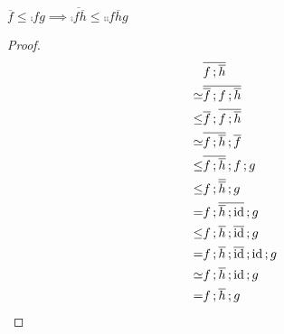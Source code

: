 \documentclass[runningheads,envcountsame]{llncs}
\begin{document}
\begin{lemma}
    $\overline{f} \leq \comp{f}{g} \implies \overline{\comp{f}{\overline{h}}} \leq \comp{\comp{f}{\overline{h}}}{g} \label{equ:restriction-insert}$
\end{lemma}
\begin{proof}
    \begin{align}
         & \overline{\comp{f}{\overline{h}}} \\
    \simeq & \overline{\comp{\overline{f}}{\comp{f}{\overline{h}}}} \\
    \leq & \comp{\overline{f}}{\overline{\comp{f}{\overline{h}}}} \\
    \simeq & \comp{\overline{\comp{f}{\overline{h}}}}{\overline{f}} \\
    \leq & \comp{\overline{\comp{f}{\overline{h}}}}{\comp{f}{g}} \\
    \leq & \comp{\comp{f}{\overline{\overline{h}}}}{g} \\
    = & \comp{\comp{f}{\overline{\comp{\overline{h}}{\id}} }}{g} \\
    \leq & \comp{\comp{f}{\comp{\overline{h}}{\overline{\id}}}}{g} \\
    = & \comp{\comp{f}{\comp{\overline{h}}{\comp{\overline{\id}}{\id}}}}{g} \\
    \simeq & \comp{\comp{f}{\comp{\overline{h}}{\id}}}{g} \\
    = & \comp{\comp{f}{\overline{h}}}{g} \\
    \end{align}
\end{proof}
\end{document}
